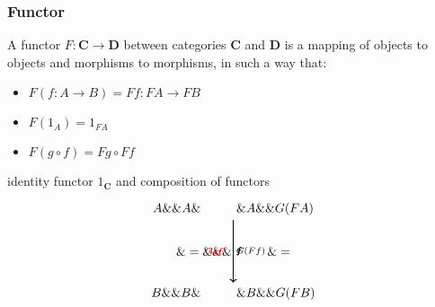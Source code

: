 \documentclass[UTF8,11pt,colorlinks,compress,openany]{beamer}%
\begin{document}
\begin{frame}\frametitle{Functor}
\begin{definition}[Functor]
A functor $F:\mathbf{C}\to\mathbf{D}$ between categories $\mathbf{C}$ and $\mathbf{D}$ is a mapping of objects to objects and morphisms to morphisms, in such a way that:
\begin{itemize}
\item $F(f: A\to B)=Ff: FA\to FB$
\item $F(1_A)=1_{FA}$
\item $F(g\circ f)=Fg\circ Ff$
\end{itemize}
\end{definition}
identity functor $1_\mathbf{C}$ and composition of functors
\[\begin{tikzcd}[column sep=tiny]
A \arrow[dd,"f","\textcolor{red}{1_\mathbf{C}}"' minimum size=1cm] \&\& A \arrow[dd,"f"] \&\hspace{1cm}\&A \arrow[dd,"f","\textcolor{red}{G\circ F}"' minimum size=1cm] \&\&G(FA) \arrow[dd,"G(Ff)"]\\
 \&= \&\&\&\hspace{1cm}\&=\\
B\&\&B\&\hspace{1cm}\&B\&\&G(FB)
\end{tikzcd}\]
\end{frame}
\end{document}
